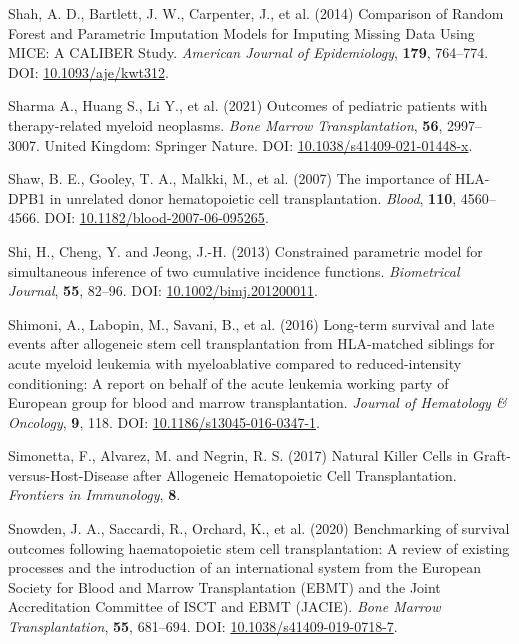\documentclass[
  letterpaper,
  DIV=11,
  numbers=noendperiod]{scrreprt}
\newlength{\cslhangindent}
\newlength{\cslentryspacingunit} %
\newenvironment{CSLReferences}[2] %
 {%
  \setlength{\parindent}{0pt}
  \ifodd #1
  \let\oldpar\par
  \def\par{\hangindent=\cslhangindent\oldpar}
  \fi
  \setlength{\parskip}{#2\cslentryspacingunit}
 }%
 {}
\begin{document}
\begin{CSLReferences}{1}{0}
\leavevmode{}%
Shah, A. D., Bartlett, J. W., Carpenter, J., et al. (2014) Comparison of
{Random Forest} and {Parametric Imputation Models} for {Imputing Missing
Data Using MICE}: {A CALIBER Study}. \emph{American Journal of
Epidemiology}, \textbf{179}, 764--774. DOI:
\href{https://doi.org/10.1093/aje/kwt312}{10.1093/aje/kwt312}.

\leavevmode{}%
Sharma A., Huang S., Li Y., et al. (2021) Outcomes of pediatric patients
with therapy-related myeloid neoplasms. \emph{Bone Marrow
Transplantation}, \textbf{56}, 2997--3007. United Kingdom: Springer
Nature. DOI:
\href{https://doi.org/10.1038/s41409-021-01448-x}{10.1038/s41409-021-01448-x}.

\leavevmode{}%
Shaw, B. E., Gooley, T. A., Malkki, M., et al. (2007) The importance of
{HLA-DPB1} in unrelated donor hematopoietic cell transplantation.
\emph{Blood}, \textbf{110}, 4560--4566. DOI:
\href{https://doi.org/10.1182/blood-2007-06-095265}{10.1182/blood-2007-06-095265}.

\leavevmode{}%
Shi, H., Cheng, Y. and Jeong, J.-H. (2013) Constrained parametric model
for simultaneous inference of two cumulative incidence functions.
\emph{Biometrical Journal}, \textbf{55}, 82--96. DOI:
\href{https://doi.org/10.1002/bimj.201200011}{10.1002/bimj.201200011}.

\leavevmode{}%
Shimoni, A., Labopin, M., Savani, B., et al. (2016) Long-term survival
and late events after allogeneic stem cell transplantation from
{HLA-matched} siblings for acute myeloid leukemia with myeloablative
compared to reduced-intensity conditioning: A report on behalf of the
acute leukemia working party of {European} group for blood and marrow
transplantation. \emph{Journal of Hematology \& Oncology}, \textbf{9},
118. DOI:
\href{https://doi.org/10.1186/s13045-016-0347-1}{10.1186/s13045-016-0347-1}.

\leavevmode{}%
Simonetta, F., Alvarez, M. and Negrin, R. S. (2017) Natural {Killer
Cells} in {Graft-versus-Host-Disease} after {Allogeneic Hematopoietic
Cell Transplantation}. \emph{Frontiers in Immunology}, \textbf{8}.

\leavevmode{}%
Snowden, J. A., Saccardi, R., Orchard, K., et al. (2020) Benchmarking of
survival outcomes following haematopoietic stem cell transplantation:
{A} review of existing processes and the introduction of an
international system from the {European Society} for {Blood} and {Marrow
Transplantation} ({EBMT}) and the {Joint Accreditation Committee} of
{ISCT} and {EBMT} ({JACIE}). \emph{Bone Marrow Transplantation},
\textbf{55}, 681--694. DOI:
\href{https://doi.org/10.1038/s41409-019-0718-7}{10.1038/s41409-019-0718-7}.


\end{CSLReferences}
\end{document}
